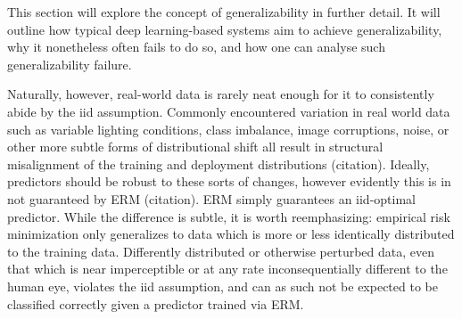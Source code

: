 	This section will explore the concept of generalizability in further detail. It will outline how typical deep learning-based systems aim to achieve generalizability, why it nonetheless often fails to do so, and how one can analyse such generalizability failure.
	
			Naturally, however, real-world data is rarely neat enough for it to consistently abide by the iid assumption. Commonly encountered variation in real world data such as variable lighting conditions, class imbalance, image corruptions, noise, or other more subtle forms of distributional shift all result in structural misalignment of the training and deployment distributions (citation). Ideally, predictors should be robust to these sorts of changes, however evidently this is in not guaranteed by ERM (citation). ERM simply guarantees an iid-optimal predictor. While the difference is subtle, it is worth reemphasizing: empirical risk minimization only generalizes to data which is more or less identically distributed to the training data. Differently distributed or otherwise perturbed data, even that which is near imperceptible or at any rate inconsequentially different to the human eye, violates the iid assumption, and can as such not be expected to be classified correctly given a predictor trained via ERM. 
	
